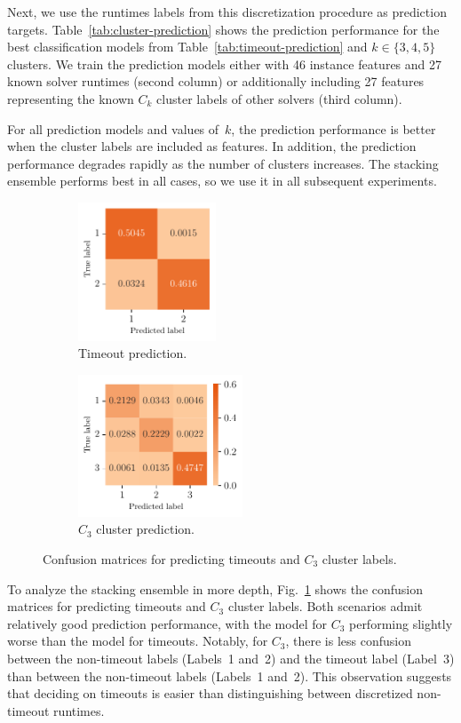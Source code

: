 \documentclass[sn-basic, Numbered]{sn-jnl} %
\begin{document}
Next, we use the runtimes labels from this discretization procedure as prediction targets.
Table~\ref{tab:cluster-prediction} shows the prediction performance for the best classification models from Table~\ref{tab:timeout-prediction} and $k \in \lbrace 3, 4, 5 \rbrace$ clusters.
We train the prediction models either with 46 instance features and 27 known solver runtimes (second column) or additionally including 27 features representing the known $C_k$ cluster labels of other solvers (third column).

For all prediction models and values of~$k$, the prediction performance is better when the cluster labels are included as features.
In addition, the prediction performance degrades rapidly as the number of clusters increases.
The stacking ensemble performs best in all cases, so we use it in all subsequent experiments.

\begin{figure}[tb]
	\centering
	\begin{subfigure}{0.45\textwidth}
		\centering
		\includegraphics[height=4.123cm]{../plots/cm2labels.pdf}
		\caption{Timeout prediction.}
	\end{subfigure}
	\begin{subfigure}{0.45\textwidth}
		\centering
		\includegraphics[height=4.228cm]{../plots/cm3labels.pdf}
		\caption{$C_3$ cluster prediction.}
	\end{subfigure}
	\caption{Confusion matrices for predicting timeouts and $C_3$ cluster labels.}
	\label{fig:confusion-matrices}
\end{figure}

To analyze the stacking ensemble in more depth, Fig.~\ref{fig:confusion-matrices} shows the confusion matrices for predicting timeouts and $C_3$ cluster labels.
Both scenarios admit relatively good prediction performance, with the model for $C_3$ performing slightly worse than the model for timeouts.
Notably, for $C_3$, there is less confusion between the non-timeout labels (Labels~1 and~2) and the timeout label (Label~3) than between the non-timeout labels (Labels~1 and~2).
This observation suggests that deciding on timeouts is easier than distinguishing between discretized non-timeout runtimes.
\end{document}
